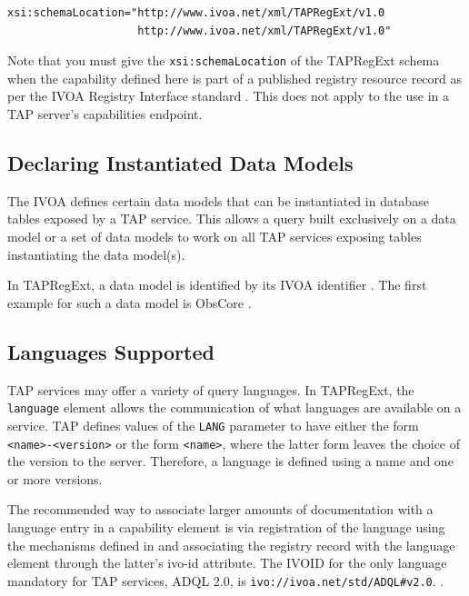\documentclass{ivoa}
\begin{document}
\begin{verbatim}
xsi:schemaLocation="http://www.ivoa.net/xml/TAPRegExt/v1.0
                    http://www.ivoa.net/xml/TAPRegExt/v1.0"
\end{verbatim}

Note that you must give the \texttt{xsi:schemaLocation} of
the TAPRegExt schema when the capability defined here is part of a published
registry resource record as per the IVOA Registry Interface standard 
\citep{std:RI1}.  This does not apply to the use
in a TAP server's capabilities endpoint.


\subsection{Declaring Instantiated Data Models}

\label{dms}

The IVOA defines certain data models that can be instantiated in database
tables exposed by a TAP service.  This allows a query built exclusively
on a data model or a set of data models to work on all TAP services exposing
tables instantiating the data model(s).

In TAPRegExt, a data model is identified by its IVOA identifier
\citep{std:VOID}.  The first example for such a data model is ObsCore
\citep{ref:OBSCORE}.


\subsection{Languages Supported}

\label{langs}

TAP services may offer a variety of query languages.  In TAPRegExt, the
\texttt{language} element allows the communication of what languages are
available on a service.  TAP defines values of the \texttt{LANG} parameter
to have either the form \texttt{<name>-<version>} or the form
\texttt{<name>}, where the latter form leaves the choice of the
version to the server.  Therefore, a language is defined using a name and one
or more versions.

The recommended way to associate larger amounts of documentation with a
language entry in a capability element is via registration of the language
using the mechanisms defined in \citep{std:STDREGEXT} and associating
the registry record with the language element through the latter's ivo-id
attribute.  The IVOID for the only language mandatory for TAP services,
ADQL 2.0, is 
\nolinkurl{ivo://ivoa.net/std/ADQL#v2.0}.
.
\end{document}
